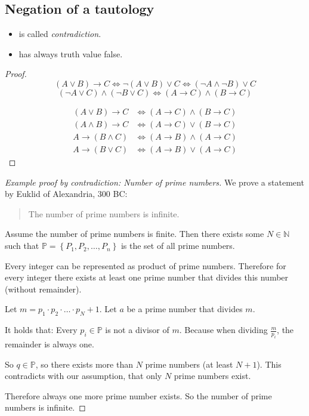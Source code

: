 \documentclass[a4paper,landscape,twocolumn]{article}
\newcommand\set[1]{\left\{#1\right\}}
\begin{document}
\subsection{Negation of a tautology}
\begin{itemize}
  \item is called \emph{contradiction}.
  \item has always truth value false.
\end{itemize}

\begin{proof}
  \[ (A \lor B) \rightarrow C \Leftrightarrow \neg (A \lor B) \lor C \Leftrightarrow (\neg A \land \neg B) \lor C \]
  \[ (\neg A \lor C) \land (\neg B \lor C) \Leftrightarrow (A \rightarrow C) \land (B \rightarrow C) \]

  \begin{align*}
    (A \lor B) \rightarrow C &\Leftrightarrow (A \rightarrow C) \land (B \rightarrow C) \\
    (A \land B) \rightarrow C &\Leftrightarrow (A \rightarrow C) \lor (B \rightarrow C) \\
    A \rightarrow (B \land C) &\Leftrightarrow (A \rightarrow B) \land (A \rightarrow C) \\
    A \rightarrow (B \lor C) &\Leftrightarrow (A \rightarrow B) \lor (A \rightarrow C)
  \end{align*}
\end{proof}

\begin{proof}[Example proof by contradiction: Number of prime numbers]
  We prove a statement by Euklid of Alexandria, 300 BC:
  \begin{quote}
    The number of prime numbers is infinite.
  \end{quote}

  Assume the number of prime numbers is finite.
  Then there exists some $N \in \mathbb N$ such that $\mathbb P = \set{P_1, P_2, \ldots, P_n}$
  is the set of all prime numbers.

  Every integer can be represented as product of prime numbers.
  Therefore for every integer there exists at least one prime number that divides this number (without remainder).

  Let $m = p_1 \cdot p_2 \cdot \ldots \cdot p_N + 1$.
  Let $a$ be a prime number that divides $m$.

  It holds that: Every $p_i \in \mathbb P$ is not a divisor of $m$.
  Because when dividing $\frac{m}{p_i}$, the remainder is always one.

  So $q \in \mathbb P$, so there exists more than $N$ prime numbers (at least $N+1$).
  This contradicts with our assumption, that only $N$ prime numbers exist.

  Therefore always one more prime number exists. So the number of prime numbers is infinite.
\end{proof}
\end{document}
